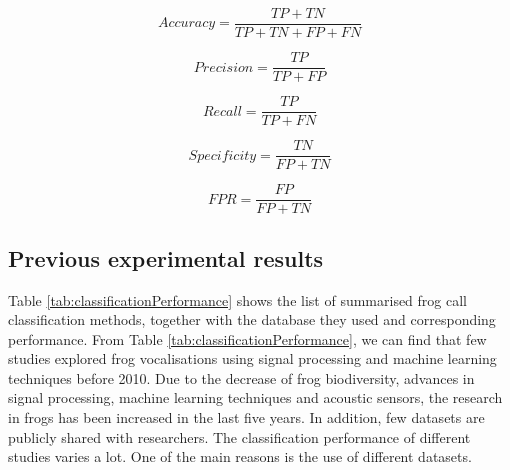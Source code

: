 \begin{equation}
Accuracy = \frac{TP+TN}{TP+TN+FP+FN}
\end{equation}

\begin{equation}
Precision = \frac{TP}{TP+FP}
\end{equation}

\begin{equation}
Recall = \frac{TP}{TP+FN}
\end{equation}

\begin{equation}
Specificity = \frac{TN}{FP+TN}
\end{equation}

\begin{equation}
FPR = \frac{FP}{FP+TN}
\end{equation}

\subsection{Previous experimental results}


Table \ref{tab:classificationPerformance} shows the list of summarised frog call classification methods, together with the database they used and corresponding performance. From Table \ref{tab:classificationPerformance}, we can find that few studies explored frog vocalisations using signal processing and machine learning techniques before 2010. Due to the decrease of frog biodiversity, advances in signal processing, machine learning techniques and acoustic sensors, the research in frogs has been increased in the last five years. In addition, few datasets are publicly shared with researchers. The classification performance of different studies varies a lot. One of the main reasons is the use of different datasets. 



